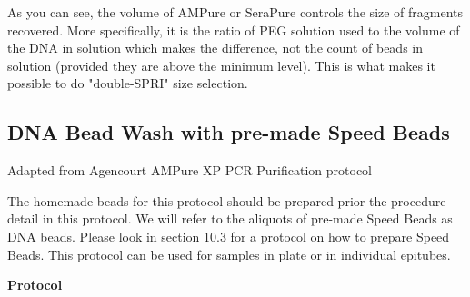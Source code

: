 \documentclass[11pt, oneside]{article}
\begin{document}
		\noindent As you can see, the volume of AMPure or SeraPure controls the size of fragments recovered. More specifically, it is the ratio of PEG 			solution used to the volume of the DNA in solution which makes the difference, not the count of beads in solution (provided they are above the 			minimum level). This is what makes it possible to do "double-SPRI" size selection. 
		
	\newpage
	
	\subsection{DNA Bead Wash with pre-made Speed Beads}
	
	\noindent Adapted from Agencourt AMPure XP PCR Purification protocol
	
	\vspace{3mm}
	
	\noindent The homemade beads for this protocol should be prepared prior the procedure detail in this protocol. We will refer to the aliquots of pre-made	Speed Beads as DNA beads. Please look in section 10.3 for a protocol on how to prepare Speed Beads. This protocol can be used for samples in plate 	or in 	individual epitubes. 
	
	\vspace{3mm}
	
	{\bf Protocol}
	
\end{document}
